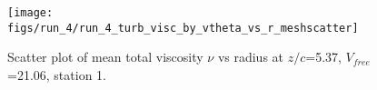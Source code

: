 \begin{figure}[H]
\centering
\texttt{[image: figs/run\_4/run\_4\_turb\_visc\_by\_vtheta\_vs\_r\_meshscatter]}
\caption{Scatter plot of mean total viscosity $\nu$ vs radius at $z/c$=5.37, $V_{free}$=21.06, station 1.}
\label{fig:run_4_turb_visc_by_vtheta_vs_r_meshscatter}
\end{figure}


